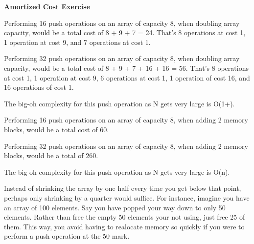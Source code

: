 \documentclass[12pt, letterpaper]{article}
\begin{document}

\noindent{\today}

\begin{center}
\textbf{Amortized Cost Exercise}
\end{center}
\vspace{0.2in}

 Performing 16 push operations on an array of capacity 8, when doubling array capacity, would be a total cost of 8 + 9 + 7 = 24. That's 8 operations at cost 1, 1 operation at cost 9, and 7 operations at cost 1.

Performing 32 push operations on an array of capacity 8, when doubling array capacity, would be a total cost of 8 + 9 + 7 + 16 + 16 = 56. That's 8 operations at cost 1, 1 operation at cost 9, 6 operations at cost 1, 1 operation of cost 16, and 16 operations of cost 1.

The big-oh complexity for this push operation as N gets very large is O(1+).

\vspace{0.5in}
 Performing 16 push operations on an array of capacity 8, when adding 2 memory blocks, would be a total cost of 60. 

Performing 32 push operations on an array of capacity 8, when adding 2 memory blocks, would be a total of 260.

The big-oh complexity for this push operation as N gets very large is O(n).

\vspace{0.5in}
 Instead of shrinking the array by one half every time you get below that point, perhaps only shrinking by a quarter would suffice. For instance, imagine you have an array of 100 elements. Say you have popped your way down to only 50 elements. Rather than free the empty 50 elements your not using, just free 25 of them. This way, you avoid having to realocate memory so quickly if you were to perform a push operation at the 50 mark.  



\end{document}
